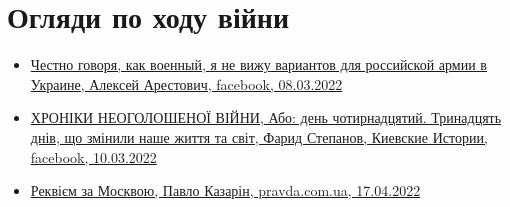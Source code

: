  
 
 
 
 
\section{Огляди по ходу війни}
\label{sec:topics.vojna.ogljady}


\begin{itemize} %
\item \hyperlink{08_03_2022.fb.arestovich_alexei.1.varianty}{%
Честно говоря, как военный, я не вижу вариантов для российской армии в Украине, Алексей Арестович, %
facebook, 08.03.2022%
}

\item \hyperlink{10_03_2022.fb.fb_group.story_kiev_ua.1.hroniki}{%
ХРОНІКИ НЕОГОЛОШЕНОЇ ВІЙНИ, Або: день чотирнадцятий. Тринадцять днів, що змінили наше життя та світ, %
Фарид Степанов, Киевские Истории, facebook, 10.03.2022%
}

\item \hyperlink{17_04_2022.stz.news.ua.pravda.1.rekviem_za_moskvoju}{%
Реквієм за Москвою, Павло Казарін, pravda.com.ua, 17.04.2022%
}

\end{itemize} %
